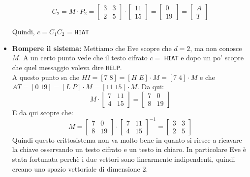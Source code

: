 \begin{itemize}
	\[
	C_2= M \cdot P_2 = \begin{bmatrix}
	3 & 3\\
	2 & 5
	\end{bmatrix} 
	\cdot \begin{bmatrix}
	11 \\
	15
	\end{bmatrix}
	=
	\begin{bmatrix}
	0\\
	19
	\end{bmatrix}
	=
	\begin{bmatrix}
	A\\
	T
	\end{bmatrix}
	\]
	
	Quindi, $c=C_1C_2$ = \texttt{HIAT}
	
	\item \textbf{Rompere il sistema:} Mettiamo che Eve scopre che $d=2$, ma non conosce $M$.
	A un certo punto vede che il testo cifrato $c=$ \texttt{HIAT} e dopo un po' scopre che quel messaggio voleva dire \texttt{HELP}.\\
	A questo punto sa che $HI = [7\; 8] = [H\; E] \cdot M = [7 \; 4] \cdot M$ e che\\
	$AT = [0\; 19] = [L\; P] \cdot M = [11 \; 15] \cdot M$. Da qui:
	\[
	M \cdot \begin{bmatrix}
	7 & 11\\
	4 & 15
	\end{bmatrix} 
	= \begin{bmatrix}
	7 & 0\\
	8 & 19
	\end{bmatrix}
	\]
	E da qui scopre che:
	\[
	M = \begin{bmatrix}
	7 & 0\\
	8 & 19
	\end{bmatrix} 
	\cdot \begin{bmatrix}
	7 & 11\\
	4 & 15
	\end{bmatrix}^{-1}
	= 
	\begin{bmatrix}
	3 & 3\\
	2 & 5
	\end{bmatrix}
	\]
	Quindi questo crittosistema non va molto bene in quanto si riesce a ricavare la chiave osservando un testo cifrato e un testo in chiaro. In particolare Eve è stata fortunata perchè i due vettori sono linearmente indipendenti, quindi creano uno spazio vettoriale di dimensione 2.
	

	
\end{itemize}

